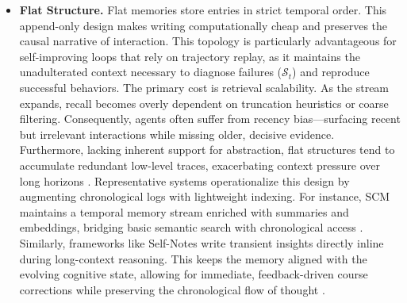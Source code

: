 \documentclass{article}
\begin{document}
\begin{itemize}[leftmargin=*]
    \item \textbf{Flat Structure.}     Flat memories store entries in strict temporal order. This append-only design makes writing computationally cheap and  preserves the causal narrative of interaction. This topology is particularly advantageous for self-improving loops that rely on trajectory replay, as it maintains the unadulterated context necessary to diagnose failures ($\mathcal{S}_t$) and reproduce successful behaviors. The primary cost is retrieval scalability. As the stream expands, recall becomes overly dependent on truncation heuristics or coarse filtering. Consequently, agents often suffer from recency bias—surfacing recent but irrelevant interactions while missing older, decisive evidence. Furthermore, lacking inherent support for abstraction, flat structures tend to accumulate redundant low-level traces, exacerbating context pressure over long horizons \citep{antony2024causal, sun2025hierarchicalmemoryhighefficiencylongterm}. Representative systems operationalize this design by augmenting chronological logs with lightweight indexing. For instance, SCM maintains a temporal memory stream enriched with summaries and embeddings, bridging basic semantic search with chronological access \citep{wang2025scmenhancinglargelanguage}. Similarly, frameworks like Self-Notes write transient insights directly inline during long-context reasoning. This keeps the memory  aligned with the evolving cognitive state, allowing for immediate, feedback-driven course corrections while preserving the chronological flow of thought \citep{lanchantin2023learningreasonmemorizeselfnotes}.


\end{itemize}
\end{document}
